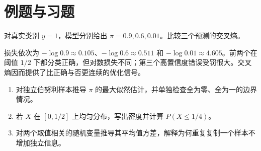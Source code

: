 \section{例题与习题}
\begin{example}[置信度与对数损失]
对真实类别 $y=1$，模型分别给出 $\pi=0.9,0.6,0.01$。比较三个预测的交叉熵。
\end{example}
\begin{solve}
损失依次为 $-\log0.9\approx0.105$、$-\log0.6\approx0.511$ 和 $-\log0.01\approx4.605$。前两个在阈值 $1/2$ 下都分类正确，但对数损失不同；第三个高置信度错误受罚很大。交叉熵因而提供了比正确与否更连续的优化信号。
\end{solve}
\begin{enumerate}
\item 对独立伯努利样本推导 $\pi$ 的最大似然估计，并单独检查全为零、全为一的边界情况。
\item 若 $X$ 在 $[0,1/2]$ 上均匀分布，写出密度并计算 $P(X\leq1/4)$。
\item 对两个取值相关的随机变量推导其平均值方差，解释为何重复复制一个样本不增加独立信息。
\end{enumerate}

